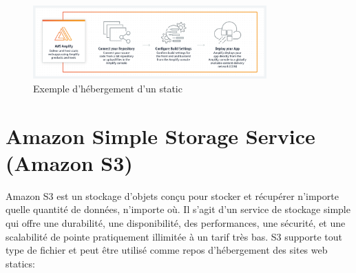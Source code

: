  \begin{figure}[H]
            \centering
                \includegraphics[width=0.8\textwidth]{Figures/amplify_dif}
	       \decoRule
		\caption[Exemple d'hébergement d'un site static]{Exemple d'hébergement d'un static}
	\label{fig:amplify}
	\end{figure}

\section{Amazon Simple Storage Service (Amazon S3)}
Amazon S3 est un stockage d'objets conçu pour stocker et récupérer n'importe quelle quantité de données, n'importe où. Il s'agit d'un service de stockage simple qui offre une durabilité, une disponibilité, des performances, une sécurité, et une scalabilité de pointe pratiquement illimitée à un tarif très bas.
S3 supporte tout type de fichier et peut être utilisé comme repos d'hébergement des sites web statics:
